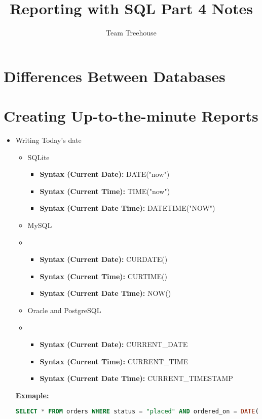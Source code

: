 \documentclass[12pt]{article}
\begin{document}
\title{Reporting with SQL Part 4 Notes}
\author{Team Treehouse}
\maketitle

\bigskip

\section{Differences Between Databases}

\bigskip

\section{Creating Up-to-the-minute Reports}

\bigskip

\begin{itemize}
    \item Writing Today's date
    \begin{itemize}
        \item SQLite
        \begin{itemize}
            \item \textbf{Syntax (Current Date):} DATE("now")
            \item \textbf{Syntax (Current Time):} TIME("now")
            \item \textbf{Syntax (Current Date Time):} DATETIME("NOW")
        \end{itemize}
        \item MySQL
        \item \begin{itemize}
            \item \textbf{Syntax (Current Date):} CURDATE()
            \item \textbf{Syntax (Current Time):} CURTIME()
            \item \textbf{Syntax (Current Date Time):} NOW()
        \end{itemize}
        \item Oracle and PostgreSQL
        \item \begin{itemize}
            \item \textbf{Syntax (Current Date):} CURRENT\_DATE
            \item \textbf{Syntax (Current Time):} CURRENT\_TIME
            \item \textbf{Syntax (Current Date Time):} CURRENT\_TIMESTAMP
        \end{itemize}
    \end{itemize}

    \bigskip

    \underline{\textbf{Exmaple:}}

    \bigskip

    \begin{lstlisting}[language=SQL]
    SELECT * FROM orders WHERE status = "placed" AND ordered_on = DATE("now");
    \end{lstlisting}

\end{itemize}
\end{document}
